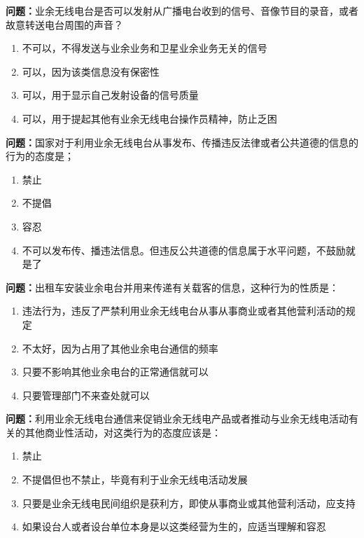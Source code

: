 \bigskip


\noindent\textbf{问题：}业余无线电台是否可以发射从广播电台收到的信号、音像节目的录音，或者故意转送电台周围的声音？
\begin{enumerate}[label=\Alph*), leftmargin=3em]
\item 不可以，不得发送与业余业务和卫星业余业务无关的信号
\item 可以，因为该类信息没有保密性
\item 可以，用于显示自己发射设备的信号质量
\item 可以，用于提起其他有业余无线电台操作员精神，防止乏困
\end{enumerate}

\bigskip


\noindent\textbf{问题：}国家对于利用业余无线电台从事发布、传播违反法律或者公共道德的信息的行为的态度是；
\begin{enumerate}[label=\Alph*), leftmargin=3em]
\item 禁止
\item 不提倡
\item 容忍
\item 不可以发布传、播违法信息。但违反公共道德的信息属于水平问题，不鼓励就是了
\end{enumerate}

\bigskip


\noindent\textbf{问题：}出租车安装业余电台并用来传递有关载客的信息，这种行为的性质是：
\begin{enumerate}[label=\Alph*), leftmargin=3em]
\item 违法行为，违反了严禁利用业余无线电台从事从事商业或者其他营利活动的规定
\item 不太好，因为占用了其他业余电台通信的频率
\item 只要不影响其他业余电台的正常通信就可以
\item 只要管理部门不来查处就可以
\end{enumerate}

\bigskip


\noindent\textbf{问题：}利用业余无线电台通信来促销业余无线电产品或者推动与业余无线电活动有关的其他商业性活动，对这类行为的态度应该是：
\begin{enumerate}[label=\Alph*), leftmargin=3em]
\item 禁止
\item 不提倡但也不禁止，毕竟有利于业余无线电活动发展
\item 只要是业余无线电民间组织是获利方，即使从事商业或其他营利活动，应支持
\item 如果设台人或者设台单位本身是以这类经营为生的，应适当理解和容忍
\end{enumerate}


